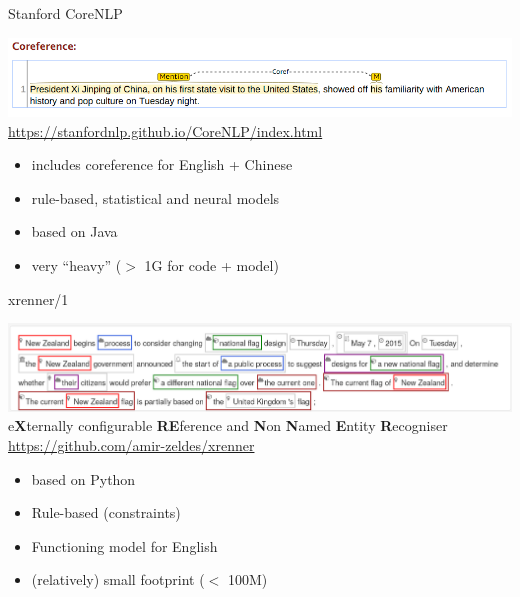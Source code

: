 \documentclass[dvipsnames, 10pt, compress]{beamer}
\begin{document}
\begin{frame}{Stanford CoreNLP}

\begin{center}
\includegraphics[width=\textwidth]{graphics/Xi-Jinping.png} \\
\url{https://stanfordnlp.github.io/CoreNLP/index.html}
\end{center}

\begin{itemize}
 \item includes coreference for English + Chinese
 \item rule-based, statistical and neural models
 \item based on Java
 \item very ``heavy'' ($>$ 1G for code + model)
\end{itemize}

\end{frame}

\begin{frame}{xrenner/1}

\begin{center}
\includegraphics[width=\textwidth]{graphics/xrenner.png} \\
   e\textbf{X}ternally configurable \textbf{RE}ference and \textbf{N}on \textbf{N}amed \textbf{E}ntity \textbf{R}ecogniser \\
\url{https://github.com/amir-zeldes/xrenner}

\end{center}

\begin{itemize}
  \item based on Python
  \item Rule-based (constraints)
  \item Functioning model for English
  \item (relatively) small footprint ($<$ 100M)
\end{itemize}


\end{frame}
\end{document}
